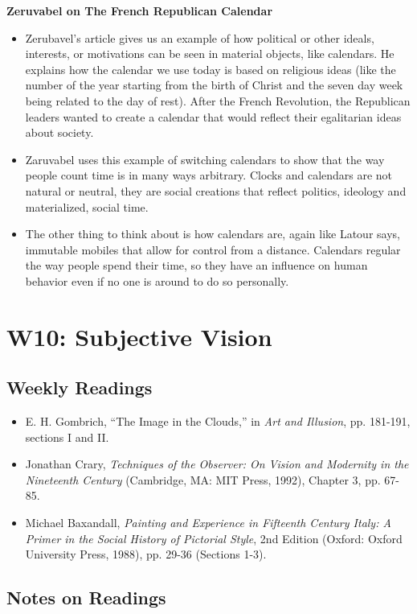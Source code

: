 \documentclass[a4paper]{article}
\begin{document}
\newpage
\noindent\textbf{Zeruvabel on The French Republican Calendar}
\begin{itemize}
	\item Zerubavel's article gives us an example of how political or other ideals, interests, or motivations can be seen in material objects, like calendars. He explains how the calendar we use today is based on religious ideas (like the number of the year starting from the birth of Christ and the seven day week being related to the day of rest). After the French Revolution, the Republican leaders wanted to create a calendar that would reflect their egalitarian ideas about society. 
	\item Zaruvabel uses this example of switching calendars to show that the way people count time is in many ways arbitrary. Clocks and calendars are not natural or neutral, they are social creations that reflect politics, ideology and materialized, social time.
	\item The other thing to think about is how calendars are, again like Latour says, immutable mobiles that allow for control from a distance. Calendars regular the way people spend their time, so they have an influence on human behavior even if no one is around to do so personally. 
\end{itemize}

\newpage
\section{W10: Subjective Vision}
\subsection*{Weekly Readings}
\begin{itemize}
	\item E. H. Gombrich, “The Image in the Clouds,” in \textit{Art and Illusion}, pp. 181-191,
	sections I and II.
	\item Jonathan Crary, \textit{Techniques of the Observer: On Vision and Modernity in the
	Nineteenth Century} (Cambridge, MA: MIT Press, 1992), Chapter 3, pp. 67-85.
	\item Michael Baxandall, \textit{Painting and Experience in Fifteenth Century Italy: A Primer in
	the Social History of Pictorial Style}, 2nd Edition (Oxford: Oxford University Press,
	1988), pp. 29-36 (Sections 1-3).
\end{itemize}

\subsection{Notes on Readings}
\end{document}
